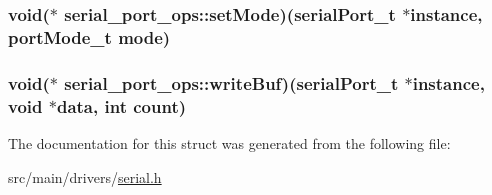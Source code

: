 \hypertarget{structserial__port__ops_aba70bea039e29356974593d1d54ab73f}{
\subsubsection[{set\+Mode}]{\setlength{\rightskip}{0pt plus 5cm}void($\ast$ serial\+\_\+port\+\_\+ops\+::set\+Mode)({\bf serial\+Port\+\_\+t} $\ast$instance, {\bf port\+Mode\+\_\+t} {\bf mode})}}\label{structserial__port__ops_aba70bea039e29356974593d1d54ab73f}
\hypertarget{structserial__port__ops_a7ed6642267f54168a1c074b6bea2f996}{
\subsubsection[{write\+Buf}]{\setlength{\rightskip}{0pt plus 5cm}void($\ast$ serial\+\_\+port\+\_\+ops\+::write\+Buf)({\bf serial\+Port\+\_\+t} $\ast$instance, void $\ast${\bf data}, int count)}}\label{structserial__port__ops_a7ed6642267f54168a1c074b6bea2f996}


The documentation for this struct was generated from the following file\+:\begin{DoxyCompactItemize}
\item 
src/main/drivers/\hyperlink{drivers_2serial_8h}{serial.\+h}\end{DoxyCompactItemize}
